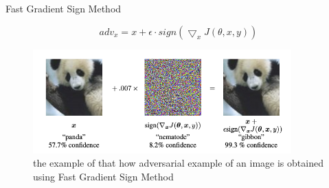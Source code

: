 \documentclass{beamer}		%
\begin{document}
\begin{frame}{Fast Gradient Sign Method}	
\begin{definition}
\[
adv_x = x+\epsilon \cdot sign(\bigtriangledown _{x}J(\theta ,x,y))
\]
\end{definition}
\begin{figure}
    \centering
    \includegraphics[height=4cm]{adversarial_example.png}
    \caption{the example of that how adversarial example of an image is obtained using Fast Gradient Sign Method}
\end{figure}
\end{frame}	
\end{document}
